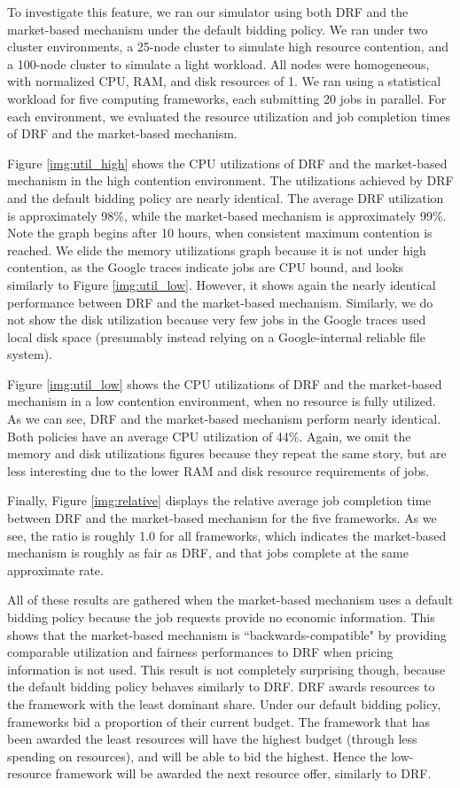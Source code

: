\documentclass{acm_proc_article-sp}
\begin{document}
To investigate this feature, we ran our simulator using both DRF and the market-based mechanism under the default bidding policy. We ran under two cluster environments, a 25-node cluster to simulate high resource contention, and a 100-node cluster to simulate a light workload. All nodes were homogeneous, with normalized CPU, RAM, and disk resources of 1. We ran using a statistical workload for five computing frameworks, each submitting 20 jobs in parallel. For each environment, we evaluated the resource utilization and job completion times of DRF and the market-based mechanism.

Figure \ref{img:util_high} shows the CPU utilizations of DRF and the market-based mechanism in the high contention environment.  The utilizations achieved by DRF and the default bidding policy are nearly identical. The average DRF utilization is approximately 98\%, while the market-based mechanism is approximately 99\%. Note the graph begins after 10 hours, when consistent maximum contention is reached. We elide the memory utilizations graph because it is not under high contention, as the Google traces indicate jobs are CPU bound, and looks similarly to Figure \ref{img:util_low}. However, it shows again the nearly identical performance between DRF and the market-based mechanism. Similarly, we do not show the disk utilization because very few jobs in the Google traces used local disk space (presumably instead relying on a Google-internal reliable file system).

Figure \ref{img:util_low} shows the CPU utilizations of DRF and the market-based mechanism in a low contention environment, when no resource is fully utilized. As we can see, DRF and the market-based mechanism perform nearly identical. Both policies have an average CPU utilization of 44\%. Again, we omit the memory and disk utilizations figures because they repeat the same story, but are less interesting due to the lower RAM and disk resource requirements of jobs.

Finally, Figure \ref{img:relative} displays the relative average job completion time between DRF and the market-based mechanism for the five frameworks. As we see, the ratio is roughly 1.0 for all frameworks, which indicates the market-based mechanism is roughly as fair as DRF, and that jobs complete at the same approximate rate.

All of these results are gathered when the market-based mechanism uses a default bidding policy because the job requests provide no economic information. This shows that the market-based mechanism is ``backwards-compatible" by providing comparable utilization and fairness performances to DRF when pricing information is not used. This result is not completely surprising though, because the default bidding policy behaves similarly to DRF. DRF awards resources to the framework with the least dominant share. Under our default bidding policy, frameworks bid a proportion of their current budget. The framework that has been awarded the least resources will have the highest budget (through less spending on resources), and will be able to bid the highest. Hence the low-resource framework will be awarded the next resource offer, similarly to DRF.
\end{document}
